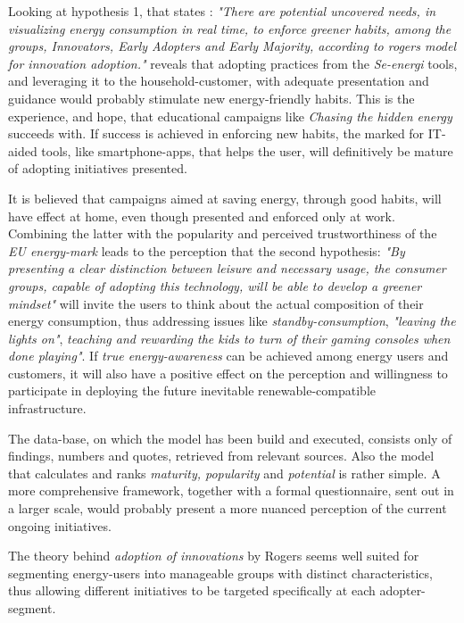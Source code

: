 \documentclass[journal]{IEEEtran}
\begin{document}
Looking at hypothesis 1, that states :
\textit{"There are potential uncovered needs, in visualizing energy consumption in real time, to enforce greener habits, among the groups, Innovators, Early Adopters and Early Majority, according to rogers model for innovation adoption."}
reveals that adopting practices from the \textit{Se-energi} tools, and leveraging it to the household-customer, with adequate presentation and guidance would probably stimulate new energy-friendly habits. This is the experience, and hope, that educational campaigns like \textit{Chasing the hidden energy} succeeds with.
If success is achieved in enforcing new habits, the marked for IT-aided tools, like smartphone-apps, that helps the user, will definitively be mature of adopting initiatives presented.  

It is believed that campaigns aimed at saving energy, through good habits, will have effect at home, even though presented and enforced only at work. Combining the latter with the popularity and perceived trustworthiness of the \textit{EU energy-mark} leads to the perception that the second hypothesis: 
\textit{"By presenting a clear distinction between leisure and necessary usage, the consumer groups, capable of adopting this technology, will be able to develop a greener mindset"} will invite the users to think about the actual composition of their energy consumption, thus addressing issues like \textit{standby-consumption}, \textit{"leaving the lights on"}, \textit{teaching and rewarding the kids to turn of their gaming consoles when done playing"}. If \textit{true energy-awareness} can be achieved among energy users and customers, it will also have a positive effect on the perception and willingness to participate in deploying the future inevitable renewable-compatible infrastructure.   \newline

The data-base, on which the model has been build and executed, consists only of findings, numbers and quotes, retrieved from relevant sources. Also the model that calculates and ranks \textit{maturity, popularity} and \textit{potential} is rather simple. A more comprehensive framework, together with a formal questionnaire, sent out in a larger scale, would probably present a more nuanced perception of the current ongoing initiatives.

The theory behind \textit{adoption of innovations} by Rogers seems well suited for segmenting energy-users into manageable groups with distinct characteristics, thus allowing different initiatives to be targeted specifically at each adopter-segment.
\end{document}

